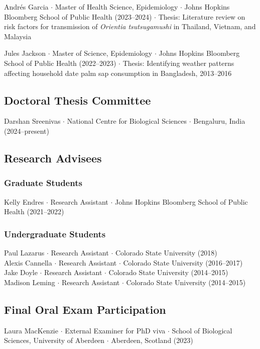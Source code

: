 \documentclass{cv}
\begin{document}
Andrés Garcia $\cdot$ Master of Health Science, Epidemiology $\cdot$ Johns Hopkins Bloomberg School of Public Health (2023--2024) $\cdot$ Thesis: Literature review on risk factors for transmission of \textit{Orientia tsutsugamushi} in Thailand, Vietnam, and Malaysia

Jules Jackson $\cdot$ Master of Science, Epidemiology $\cdot$ Johns Hopkins Bloomberg School of Public Health (2022--2023) $\cdot$ Thesis: Identifying weather patterns affecting household date palm sap consumption in Bangladesh, 2013--2016

\subsection*{Doctoral Thesis Committee}

Darshan Sreenivas $\cdot$ National Centre for Biological Sciences $\cdot$ Bengaluru, India (2024--present)

\subsection*{Research Advisees}

\subsubsection*{Graduate Students}

Kelly Endres $\cdot$ Research Assistant $\cdot$ Johns Hopkins Bloomberg School of Public Health (2021--2022)

\subsubsection*{Undergraduate Students}

Paul Lazarus $\cdot$ Research Assistant $\cdot$ Colorado State University (2018) \\
Alexis Cannella $\cdot$ Research Assistant $\cdot$ Colorado State University (2016--2017) \\
Jake Doyle $\cdot$ Research Assistant $\cdot$ Colorado State University (2014--2015) \\
Madison Leming $\cdot$ Research Assistant $\cdot$ Colorado State University (2014--2015)

\subsection*{Final Oral Exam Participation}

Laura MacKenzie $\cdot$ External Examiner for PhD viva $\cdot$ School of Biological Sciences, University of Aberdeen $\cdot$ Aberdeen, Scotland (2023)
\end{document}
